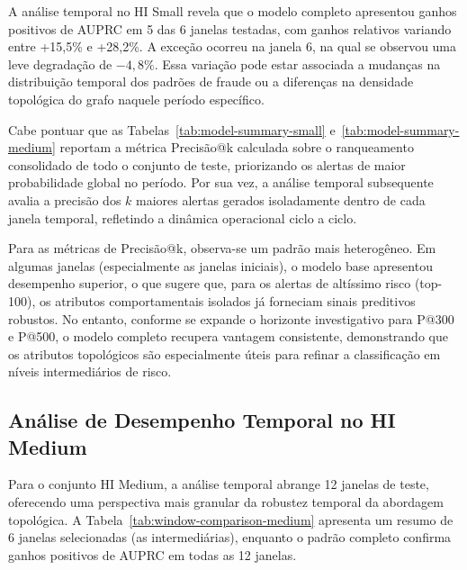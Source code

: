 \documentclass[titlepage,a4paper,oneside,onecolumn,12pt]{report}
\begin{document}
A análise temporal no HI Small revela que o modelo completo apresentou ganhos positivos de AUPRC em 5 das 6 janelas testadas, com ganhos relativos variando entre +15,5\% e +28,2\%. A exceção ocorreu na janela 6, na qual se observou uma leve degradação de $-4,8\%$. Essa variação pode estar associada a mudanças na distribuição temporal dos padrões de fraude ou a diferenças na densidade topológica do grafo naquele período específico.

Cabe pontuar que as Tabelas~\ref{tab:model-summary-small} e~\ref{tab:model-summary-medium} reportam a métrica Precisão@k calculada sobre o ranqueamento consolidado de todo o conjunto de teste, priorizando os alertas de maior probabilidade global no período. Por sua vez, a análise temporal subsequente avalia a precisão dos $k$ maiores alertas gerados isoladamente dentro de cada janela temporal, refletindo a dinâmica operacional ciclo a ciclo.

Para as métricas de Precisão@k, observa-se um padrão mais heterogêneo. Em algumas janelas (especialmente as janelas iniciais), o modelo base apresentou desempenho superior, o que sugere que, para os alertas de altíssimo risco (top-100), os atributos comportamentais isolados já forneciam sinais preditivos robustos. No entanto, conforme se expande o horizonte investigativo para P@300 e P@500, o modelo completo recupera vantagem consistente, demonstrando que os atributos topológicos são especialmente úteis para refinar a classificação em níveis intermediários de risco.

\subsection{Análise de Desempenho Temporal no HI Medium}

Para o conjunto HI Medium, a análise temporal abrange 12 janelas de teste, oferecendo uma perspectiva mais granular da robustez temporal da abordagem topológica. A Tabela~\ref{tab:window-comparison-medium} apresenta um resumo de 6 janelas selecionadas (as intermediárias), enquanto o padrão completo confirma ganhos positivos de AUPRC em todas as 12 janelas.
\end{document}
